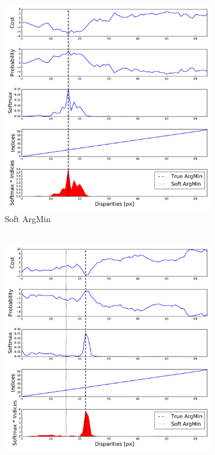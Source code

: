 \begin{figure}[t]
	\begin{center}
    		\begin{subfigure}[b]{0.32\linewidth}
			\includegraphics[width=\linewidth]{argmin/soft_argmin.pdf}
	        \caption{Soft ArgMin\\~}
		\end{subfigure}
    		\begin{subfigure}[b]{0.32\linewidth}
			\includegraphics[width=\linewidth]{argmin/soft_argmin_multimodal.pdf}

\end{subfigure}
\end{center}
\end{figure}
